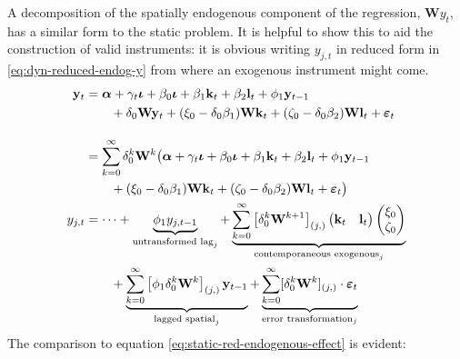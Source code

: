 A decomposition of the spatially endogenous component of the regression, $\mathbf Wy_t$,
has a similar form to the static problem.
It is helpful to show this to aid the construction of valid instruments:
it is obvious writing $y_{j,t}$ in reduced form in \eqref{eq:dyn-reduced-endog-y}
from where an exogenous instrument might come.
\begin{align}
    \mathbf{y}_t 
    &= \boldsymbol{\alpha} 
        + \gamma_t \boldsymbol{\iota} 
        + \beta_0 \boldsymbol{\iota} 
        + \beta_1 \mathbf{k}_t 
        + \beta_2 \mathbf{l}_t 
        + \phi_1 \mathbf{y}_{t-1} 
    \\ &\qquad \notag
        + \delta_0 \mathbf{W} \mathbf{y}_t
        + (\xi_0 - \delta_0\beta_1) \mathbf{W}\mathbf{k}_t 
        + (\zeta_0 - \delta_0\beta_2) \mathbf{W}\mathbf{l}_t
        + \boldsymbol{\varepsilon}_t
    \\[1em]
    \label{eq:dyn-reduced-spatial-lag}
    &= \sum_{k=0}^\infty \delta_0^k \mathbf{W}^k \big( 
        \boldsymbol{\alpha} 
        + \gamma_t \boldsymbol{\iota} 
        + \beta_0 \boldsymbol{\iota} 
        + \beta_1 \mathbf{k}_t 
        + \beta_2 \mathbf{l}_t \notag
        + \phi_1 \mathbf{y}_{t-1} 
    \\ &\qquad \notag
        + (\xi_0 - \delta_0\beta_1) \mathbf{W}\mathbf{k}_t 
        + (\zeta_0 - \delta_0\beta_2) \mathbf{W}\mathbf{l}_t
        + \boldsymbol{\varepsilon}_t 
    \big)
    \\
    y_{j,t} 
    &= \dots 
        + \underbrace{
            \phi_1 y_{j,t-1}
        }_{\text{untransformed lag}_j}
        + \underbrace{ 
            \sum_{k=0}^\infty \left[ \delta_0^k \mathbf{W}^{k+1} \right]_{(j,)} 
            \begin{pmatrix}\mathbf{k}_t & \mathbf{l}_t\end{pmatrix} 
            \begin{pmatrix} \xi_0 \\ \zeta_0 \end{pmatrix} 
        }_{\text{contemporaneous exogenous}_j}
    \\ &\qquad \notag
        + \underbrace{ 
            \sum_{k=0}^\infty \left[ \phi_1 \delta_0^k \mathbf{W}^k \right]_{(j,)} 
            \mathbf{y}_{t-1} 
        }_{\text{lagged spatial}_j}
        + \underbrace{ 
            \sum_{k=0}^\infty [\delta_0^k \mathbf{W}^k]_{(j,)} 
            \cdot \boldsymbol{\varepsilon}_t 
        }_{\text{error transformation}_j}
\end{align}
The comparison to equation \eqref{eq:static-red-endogenous-effect} is evident:
